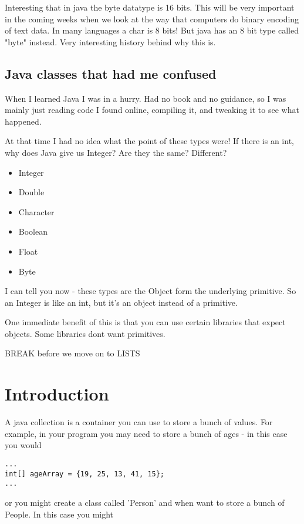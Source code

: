 \documentclass[12pt]{article}
\begin{document}
Interesting that in java the byte datatype is 16 bits. This will be very
important in the coming weeks when we look at the way that computers do binary
encoding of text data. In many languages a char is 8 bits! But java has an 8
bit type called "byte" instead. Very interesting history behind why this is.

\subsection{Java classes that had me confused}
When I learned Java I was in a hurry. Had no book and no guidance, so I was
mainly just reading code I found online, compiling it, and tweaking it to see
what happened.

At that time I had no idea what the point of these types were! If there is an
int, why does Java give us Integer? Are they the same? Different?

\begin{itemize}
\item Integer
\item Double
\item Character
\item Boolean
\item Float
\item Byte
\end{itemize}

I can tell you now - these types are the Object form the underlying primitive.
So an Integer is like an int, but it's an object instead of a primitive. 

One immediate benefit of this is that you can use certain libraries that expect
objects. Some libraries dont want primitives.


BREAK before we move on to LISTS

\section{Introduction}
A java collection is a container you can use to store a bunch of values. For example, in your program you may need to store a bunch of ages - in this case you would

\begin{lstlisting}
...
int[] ageArray = {19, 25, 13, 41, 15};
...
\end{lstlisting} 

or you might create a class called 'Person' and when want to store a bunch of People. In this case you might
\end{document}
